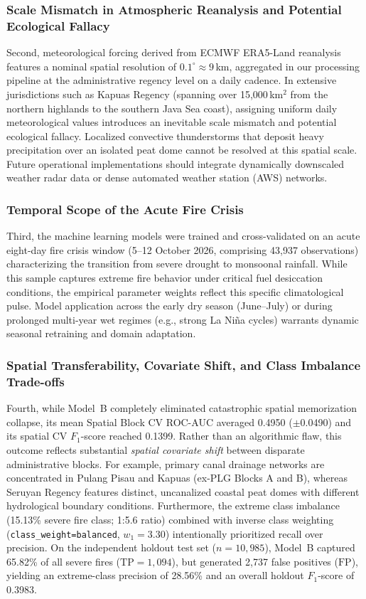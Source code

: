 \subsubsection{Scale Mismatch in Atmospheric Reanalysis and Potential Ecological Fallacy}
Second, meteorological forcing derived from ECMWF ERA5-Land reanalysis features a nominal spatial resolution of $0.1^\circ \approx 9$\,km, aggregated in our processing pipeline at the administrative regency level on a daily cadence. In extensive jurisdictions such as Kapuas Regency (spanning over 15,000\,km$^2$ from the northern highlands to the southern Java Sea coast), assigning uniform daily meteorological values introduces an inevitable scale mismatch and potential ecological fallacy. Localized convective thunderstorms that deposit heavy precipitation over an isolated peat dome cannot be resolved at this spatial scale. Future operational implementations should integrate dynamically downscaled weather radar data or dense automated weather station (AWS) networks.

\subsubsection{Temporal Scope of the Acute Fire Crisis}
Third, the machine learning models were trained and cross-validated on an acute eight-day fire crisis window (5--12 October 2026, comprising 43,937 observations) characterizing the transition from severe drought to monsoonal rainfall. While this sample captures extreme fire behavior under critical fuel desiccation conditions, the empirical parameter weights reflect this specific climatological pulse. Model application across the early dry season (June--July) or during prolonged multi-year wet regimes (e.g., strong La Ni\~na cycles) warrants dynamic seasonal retraining and domain adaptation.

\subsubsection{Spatial Transferability, Covariate Shift, and Class Imbalance Trade-offs}
Fourth, while Model~B completely eliminated catastrophic spatial memorization collapse, its mean Spatial Block CV ROC-AUC averaged 0.4950 ($\pm$0.0490) and its spatial CV $F_1$-score reached 0.1399. Rather than an algorithmic flaw, this outcome reflects substantial \textit{spatial covariate shift} between disparate administrative blocks. For example, primary canal drainage networks are concentrated in Pulang Pisau and Kapuas (ex-PLG Blocks A and B), whereas Seruyan Regency features distinct, uncanalized coastal peat domes with different hydrological boundary conditions. Furthermore, the extreme class imbalance (15.13\% severe fire class; 1:5.6 ratio) combined with inverse class weighting (\texttt{class\_weight=balanced}, $w_1 = 3.30$) intentionally prioritized recall over precision. On the independent holdout test set ($n = 10,985$), Model~B captured 65.82\% of all severe fires ($\text{TP} = 1,094$), but generated 2,737 false positives ($\text{FP}$), yielding an extreme-class precision of 28.56\% and an overall holdout $F_1$-score of 0.3983.


